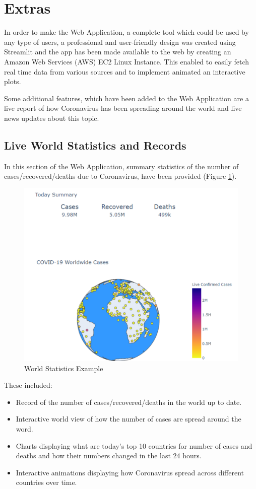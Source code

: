 \section{Extras}
In order to make the Web Application, a complete tool which could be used by any type of users, a professional and user-friendly design was created using Streamlit and the app has been made available to the web by creating an Amazon Web Services (AWS) EC2 Linux Instance. This enabled to easily fetch real time data from various sources and to implement animated an interactive plots.

Some additional features, which have been added to the Web Application are a live report of how Coronavirus has been spreading around the world and live news updates about this topic.

\subsection{Live World Statistics and Records}

In this section of the Web Application, summary statistics of the number of cases/recovered/deaths due to Coronavirus, have been provided (Figure \ref{world}). 

\begin{figure}[ht!]%
    \centering
    \includegraphics[width=0.75\linewidth]{latex/images/world.pdf}
    \caption{World Statistics Example}
    \label{world}
\end{figure}

These included:

\begin{itemize}
    \setlength\itemsep{-0.3cm}
    \item Record of the number of cases/recovered/deaths in the world up to date.
    \item Interactive world view of how the number of cases are spread around the word.
    \item Charts displaying what are today's top 10 countries for number of cases and deaths and how their numbers changed in the last 24 hours.
    \item Interactive animations displaying how Coronavirus spread across different countries over time.
\end{itemize}

